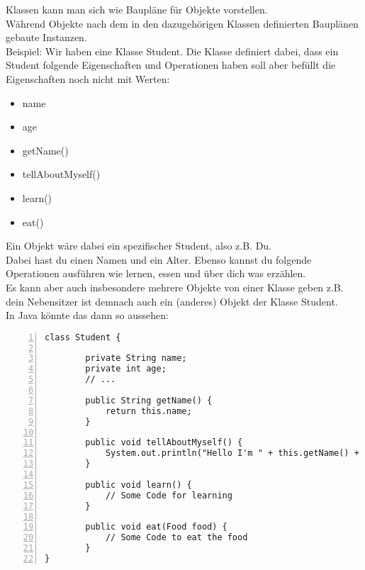 


\begin{Infobox}
    Klassen kann man sich wie Baupläne für Objekte vorstellen.\\
    Während Objekte nach dem in den dazugehörigen Klassen definierten Bauplänen gebaute Instanzen.\\

    Beispiel: Wir haben eine Klasse Student.
    Die Klasse definiert dabei, dass ein Student folgende Eigenschaften und Operationen haben soll aber befüllt die Eigenschaften noch nicht mit Werten:

    \begin{itemize}
        \item name
        \item age
        \item getName()
        \item tellAboutMyself()
        \item learn()
        \item eat()
    \end{itemize}

    Ein Objekt wäre dabei ein spezifischer Student, also z.B. Du.\\
    Dabei hast du einen Namen und ein Alter.
    Ebenso kannst du folgende Operationen ausführen wie lernen, essen und über dich was erzählen.\\
    Es kann aber auch insbesondere mehrere Objekte von einer Klasse geben z.B. dein Nebensitzer ist demnach auch ein (anderes) Objekt der Klasse Student.\\
    In Java könnte das dann so aussehen:

    \begin{lstlisting}[numbers=left,xleftmargin=2em,frame=single,framexleftmargin=1.5em]
class Student {

        private String name;
        private int age;
        // ...

        public String getName() {
            return this.name;
        }

        public void tellAboutMyself() {
            System.out.println("Hello I'm " + this.getName() + ". I'm " + age + " old!";
        }

        public void learn() {
            // Some Code for learning
        }

        public void eat(Food food) {
            // Some Code to eat the food
        }
}

    \end{lstlisting}
\end{Infobox}

